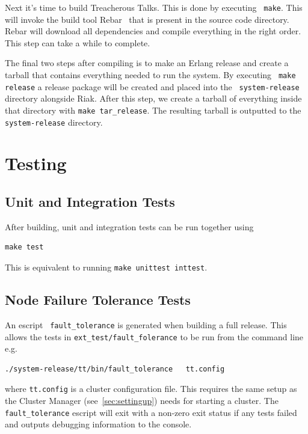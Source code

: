 \documentclass[11pt,a4paper]{report}
\begin{document}
Next it's time to build Treacherous Talks. This is done by executing {\tt
  make}. This will invoke the build tool Rebar~\cite{rebar} that is present in the source
code directory. Rebar will download all dependencies and compile everything in
the right order. This step can take a while to complete.

The final two steps after compiling is to make an Erlang release and create a
tarball that contains everything needed to run the system. By executing {\tt
  make release} a release package will be created and placed into the {\tt
  system-release} directory alongside Riak. After this step, we create a tarball
of everything inside that directory with {\tt make tar\_release}. The resulting
tarball is outputted to the {\tt system-release} directory.

\section{Testing}

\subsection{Unit and Integration Tests}

After building, unit and integration tests can be run together using

\begin{Verbatim}
make test
\end{Verbatim}

This is equivalent to running {\tt make unittest inttest}.

\subsection{Node Failure Tolerance Tests}\label{run_fault_tolerance}

An escript~\cite{escript} {\tt fault\_tolerance} is generated when building a full release. This
allows the tests in {\tt ext\_test/fault\_folerance} to be run from the command
line e.g.

\begin{Verbatim}
./system-release/tt/bin/fault_tolerance   tt.config
\end{Verbatim}
where {\tt tt.config} is a cluster configuration file. This requires the same
setup as the Cluster Manager (see~\ref{sec:settingup}) needs for starting a cluster. The
{\tt fault\_tolerance} escript will exit with a non-zero exit status if any tests
failed and outputs debugging information to the console.
\end{document}
